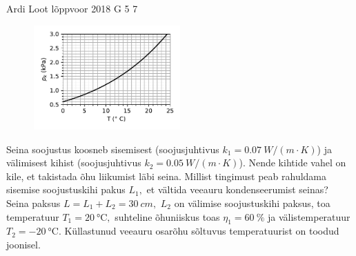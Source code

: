 \documentclass[11pt]{article}
\begin{document}
{{
\fi
}

{Ardi Loot} %
{lõppvoor} %
{2018} %
{G 5} %
{7} %
{
\ifStatement
\begin{figure}
\vspace{-30pt}
\begin{center}
\includegraphics[width=0.5\textwidth]{2018-v3g-05-kullastunud-aur}
\par\end{center} 
\end{figure}

Seina soojustus koosneb sisemisest (soojusjuhtivus $k_{1}=\SI{0.07}{W/\left(m\cdot K\right)}$)
ja välimisest kihist (soojusjuhtivus $k_{2}=\SI{0.05}{W/\left(m\cdot K\right)}$).
Nende kihtide vahel on kile, et takistada õhu liikumist läbi seina.
Millist tingimust peab rahuldama sisemise soojustuskihi pakus $L_{1},$
et vältida veeauru kondenseerumist seinas? Seina paksus $L=L_{1}+L_{2}=\SI{30}{cm},$
$L_{2}$ on välimise soojustuskihi paksus, toa temperatuur $T_{1}=\SI{20}{\celsius},$
suhteline õhuniiskus toas $\eta_{1}=\SI{60}{\percent}$ ja välistemperatuur
$T_{2}=\SI{-20}{\celsius}.$ Küllastunud veeauru osarõhu sõltuvus
temperatuurist on toodud joonisel.

}}
\end{document}
